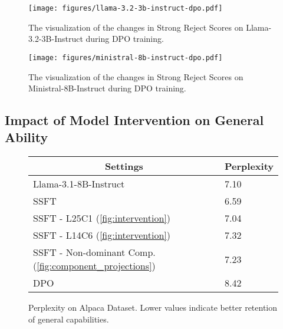\begin{figure}[t]
    \centering
    \newcommand{\LeftAdjust}{0em}
    \begin{minipage}[t]{0.49\textwidth}
    \vspace*{\LeftAdjust}
        \centering    
        \texttt{[image: figures/llama-3.2-3b-instruct-dpo.pdf]}
        \vspace{-2.0em}
        \caption{The visualization of the changes in Strong Reject Scores on Llama-3.2-3B-Instruct during DPO training.}
        \label{fig:dpo-llama3.2-3b}
    \end{minipage}
    \hfill
    \newcommand{\RightAdjust}{0em}
    \begin{minipage}[t]{0.49\textwidth}
    \vspace*{\RightAdjust}
        \centering
        \texttt{[image: figures/ministral-8b-instruct-dpo.pdf]}
        \vspace{-2.0em}
        \caption{The visualization of the changes in Strong Reject Scores on Ministral-8B-Instruct during DPO training.}
        \label{fig:dpo-ministral}
    \end{minipage}
\end{figure}

\subsection{Impact of Model Intervention on General Ability}
\label{sec:impact_inter}

\begin{wrapfigure}{r}{0.5\textwidth}
    \centering
    \caption{Perplexity on Alpaca Dataset. Lower values indicate better retention of general capabilities.}
    \label{tab:ppl}
    \begin{small}
    \sc
    \setlength\tabcolsep{12pt}
    \renewcommand{\arraystretch}{1.1}
    \begin{tabular}{@{}ll@{}}
    \toprule
    \multicolumn{1}{c}{\textbf{Settings}} & \multicolumn{1}{c}{\textbf{Perplexity}} \\
    \midrule
    Llama-3.1-8B-Instruct & 7.10 \\
    \hspace{1em}SSFT & 6.59 \\
    \hspace{1em}SSFT - L25C1 (\autoref{fig:intervention}) & 7.04 \\
    \hspace{1em}SSFT - L14C6 (\autoref{fig:intervention})& 7.32 \\
    \hspace{1em}SSFT - Non-dominant Comp. (\autoref{fig:component_projections}) & 7.23 \\
    \hspace{1em}DPO & 8.42 \\
    \bottomrule
    \end{tabular}
    \end{small}
\end{wrapfigure}

